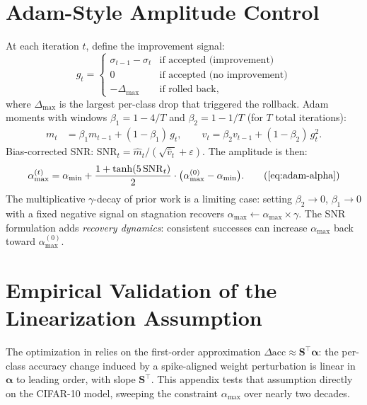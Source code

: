 \documentclass[11pt,a4paper]{article}
\newcommand{\mat}[1]{\bm{#1}}
\newcommand{\vect}[1]{\bm{#1}}
\begin{document}
\section{Adam-Style Amplitude Control}
\label{app:adam-alpha}

At each iteration $t$, define the improvement signal:
\begin{equation}
g_t = \begin{cases}
  \sigma_{t-1} - \sigma_t & \text{if accepted (improvement)} \\
  0                        & \text{if accepted (no improvement)} \\
  -\Delta_{\max}           & \text{if rolled back,}
\end{cases}
\label{eq:signal}
\end{equation}
where $\Delta_{\max}$ is the largest per-class drop that triggered the
rollback. Adam moments with windows $\beta_1 = 1 - 4/T$ and
$\beta_2 = 1 - 1/T$ (for $T$ total iterations):
\begin{align}
m_t &= \beta_1 m_{t-1} + (1-\beta_1)\,g_t, \qquad
v_t  = \beta_2 v_{t-1} + (1-\beta_2)\,g_t^2.
\end{align}
Bias-corrected SNR: $\mathrm{SNR}_t = \hat{m}_t /
(\sqrt{\hat{v}_t} + \varepsilon)$. The amplitude is then:
\begin{equation}
\alpha_{\max}^{(t)} = \alpha_{\min}
  + \frac{1 + \tanh(5\,\mathrm{SNR}_t)}{2}
  \cdot \bigl(\alpha_{\max}^{(0)} - \alpha_{\min}\bigr).
\tag{\ref{eq:adam-alpha}}
\end{equation}
The multiplicative $\gamma$-decay of prior work is a limiting case:
setting $\beta_2 \to 0$, $\beta_1 \to 0$ with a fixed negative signal
on stagnation recovers $\alpha_{\max} \leftarrow \alpha_{\max} \times
\gamma$. The SNR formulation adds \emph{recovery dynamics}: consistent
successes can increase $\alpha_{\max}$ back toward $\alpha_{\max}^{(0)}$.

\section{Empirical Validation of the Linearization Assumption}
\label{app:linearization}

The optimization in  relies on the first-order
approximation $\Delta\mathrm{acc} \approx \mat{S}^\top\vect{\alpha}$:
the per-class accuracy change induced by a spike-aligned weight
perturbation is linear in $\vect{\alpha}$ to leading order, with
slope $\mat{S}^\top$. This appendix tests that assumption directly on
the CIFAR-10 model, sweeping the constraint $\alpha_{\max}$ over
nearly two decades.
\end{document}
